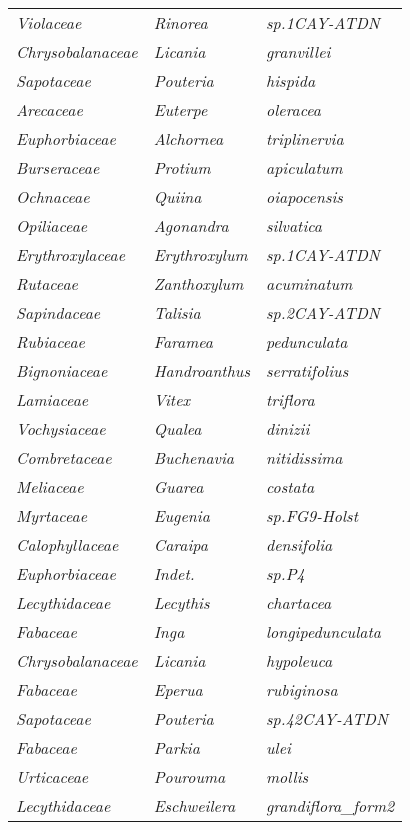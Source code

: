 \documentclass[fleqn,10pt]{ArtEcoFoG} %
\renewenvironment{table}{\begin{table*}}{\end{table*}\ignorespacesafterend}
\begin{document}
\begin{table}
\begin{tabular}[t]{lll}
\em{Violaceae} & \em{Rinorea} & \em{sp.1CAY-ATDN}\\
\em{Chrysobalanaceae} & \em{Licania} & \em{granvillei}\\
\em{Sapotaceae} & \em{Pouteria} & \em{hispida}\\
\addlinespace
\em{Arecaceae} & \em{Euterpe} & \em{oleracea}\\
\em{Euphorbiaceae} & \em{Alchornea} & \em{triplinervia}\\
\em{Burseraceae} & \em{Protium} & \em{apiculatum}\\
\em{Ochnaceae} & \em{Quiina} & \em{oiapocensis}\\
\em{Opiliaceae} & \em{Agonandra} & \em{silvatica}\\
\addlinespace
\em{Erythroxylaceae} & \em{Erythroxylum} & \em{sp.1CAY-ATDN}\\
\em{Rutaceae} & \em{Zanthoxylum} & \em{acuminatum}\\
\em{Sapindaceae} & \em{Talisia} & \em{sp.2CAY-ATDN}\\
\em{Rubiaceae} & \em{Faramea} & \em{pedunculata}\\
\em{Bignoniaceae} & \em{Handroanthus} & \em{serratifolius}\\
\addlinespace
\em{Lamiaceae} & \em{Vitex} & \em{triflora}\\
\em{Vochysiaceae} & \em{Qualea} & \em{dinizii}\\
\em{Combretaceae} & \em{Buchenavia} & \em{nitidissima}\\
\em{Meliaceae} & \em{Guarea} & \em{costata}\\
\em{Myrtaceae} & \em{Eugenia} & \em{sp.FG9-Holst}\\
\addlinespace
\em{Calophyllaceae} & \em{Caraipa} & \em{densifolia}\\
\em{Euphorbiaceae} & \em{Indet.} & \em{sp.P4}\\
\em{Lecythidaceae} & \em{Lecythis} & \em{chartacea}\\
\em{Fabaceae} & \em{Inga} & \em{longipedunculata}\\
\em{Chrysobalanaceae} & \em{Licania} & \em{hypoleuca}\\
\addlinespace
\em{Fabaceae} & \em{Eperua} & \em{rubiginosa}\\
\em{Sapotaceae} & \em{Pouteria} & \em{sp.42CAY-ATDN}\\
\em{Fabaceae} & \em{Parkia} & \em{ulei}\\
\em{Urticaceae} & \em{Pourouma} & \em{mollis}\\
\em{Lecythidaceae} & \em{Eschweilera} & \em{grandiflora\_form2}\\

\end{tabular}
\end{table}
\end{document}
